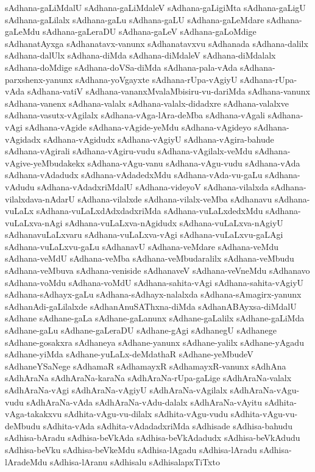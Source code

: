 {sAdhana-gaLiMdalU
sAdhana-gaLiMdaleV
sAdhana-gaLigiMta
sAdhana-gaLigU
sAdhana-gaLilalx
sAdhana-gaLu
sAdhana-gaLU
sAdhana-gaLeMdare
sAdhana-gaLeMdu
sAdhana-gaLeraDU
sAdhana-gaLeV
sAdhana-gaLoMdige
sAdhanatAyxga
sAdhanatavx-vanunx
sAdhanatavxvu
sAdhanada
sAdhana-dalilx
sAdhana-dalUlx
sAdhana-diMda
sAdhana-diMdaleV
sAdhana-diMdalalx
sAdhana-doMdige
sAdhana-doVSa-diMda
sAdhana-pala-vAda
sAdhana-parxshenx-yanunx
sAdhana-yoVgayxte
sAdhana-rUpa-vAgiyU
sAdhana-rUpa-vAda
sAdhana-vatiV
sAdhana-vananxMvalaMbisiru-vu-dariMda
sAdhana-vanunx
sAdhana-vanenx
sAdhana-valalx
sAdhana-valalx-didadxre
sAdhana-valalxve
sAdhana-vasutx-vAgilalx
sAdhana-vAga-lAra-deMba
sAdhana-vAgali
sAdhana-vAgi
sAdhana-vAgide
sAdhana-vAgide-yeMdu
sAdhana-vAgideyo
sAdhana-vAgidadx
sAdhana-vAgidudx
sAdhana-vAgiyU
sAdhana-vAgira-bahude
sAdhana-vAgirali
sAdhana-vAgiru-vudu
sAdhana-vAgilalx-veMdu
sAdhana-vAgive-yeMbudakekx
sAdhana-vAgu-vanu
sAdhana-vAgu-vudu
sAdhana-vAda
sAdhana-vAdadudx
sAdhana-vAdadedxMdu
sAdhana-vAda-vu-gaLu
sAdhana-vAdudu
sAdhana-vAdadxriMdalU
sAdhana-videyoV
sAdhana-vilalxda
sAdhana-vilalxdava-nAdarU
sAdhana-vilalxde
sAdhana-vilalx-veMba
sAdhanavu
sAdhana-vuLaLx
sAdhana-vuLaLxdAdxdadxriMda
sAdhana-vuLaLxdedxMdu
sAdhana-vuLaLxva-nAgi
sAdhana-vuLaLxva-nAgidudx
sAdhana-vuLaLxva-nAgiyU
sAdhanavuLaLxvaru
sAdhana-vuLaLxva-vAgi
sAdhana-vuLaLxvu-gaLAgi
sAdhana-vuLaLxvu-gaLu
sAdhanavU
sAdhana-veMdare
sAdhana-veMdu
sAdhana-veMdU
sAdhana-veMba
sAdhana-veMbudaralilx
sAdhana-veMbudu
sAdhana-veMbuva
sAdhana-veniside
sAdhanaveV
sAdhana-veVneMdu
sAdhanavo
sAdhana-voMdu
sAdhana-voMdU
sAdhana-sahita-vAgi
sAdhana-sahita-vAgiyU
sAdhana-sAdhayx-gaLu
sAdhana-sAdhayx-nalalxda
sAdhana-sAmagirx-yanunx
sAdhanAdi-gaLilalxde
sAdhanAnuSAThxna-diMda
sAdhanABAyxsa-diMdalU
sAdhane
sAdhane-gaLa
sAdhane-gaLanunx
sAdhane-gaLalilx
sAdhane-gaLiMda
sAdhane-gaLu
sAdhane-gaLeraDU
sAdhane-gAgi
sAdhanegU
sAdhanege
sAdhane-gosakxra
sAdhaneya
sAdhane-yanunx
sAdhane-yalilx
sAdhane-yAgadu
sAdhane-yiMda
sAdhane-yuLaLx-deMdathaR
sAdhane-yeMbudeV
sAdhaneYSaNege
sAdhamaR
sAdhamayxR
sAdhamayxR-vanunx
sAdhAna
sAdhAraNa
sAdhAraNa-karaNa
sAdhAraNa-rUpa-gaLige
sAdhAraNa-valalx
sAdhAraNa-vAgi
sAdhAraNa-vAgiyU
sAdhAraNa-vAgilalx
sAdhAraNa-vAgu-vudu
sAdhAraNa-vAda
sAdhAraNa-vAdu-dalalx
sAdhAraNa-vAyitu
sAdhita-vAga-takakxvu
sAdhita-vAgu-vu-dilalx
sAdhita-vAgu-vudu
sAdhita-vAgu-vu-deMbudu
sAdhita-vAda
sAdhita-vAdadadxriMda
sAdhisade
sAdhisa-bahudu
sAdhisa-bAradu
sAdhisa-beVkAda
sAdhisa-beVkAdadudx
sAdhisa-beVkAdudu
sAdhisa-beVku
sAdhisa-beVkeMdu
sAdhisa-lAgadu
sAdhisa-lAradu
sAdhisa-lAradeMdu
sAdhisa-lAranu
sAdhisalu
sAdhisalapxTiTxto
}
